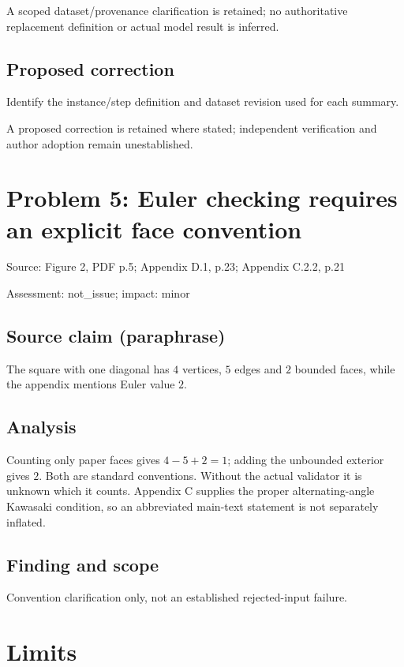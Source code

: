 \documentclass[11pt]{article}
\begin{document}
A scoped dataset/provenance clarification is retained; no authoritative replacement definition or actual model result is inferred.

\subsection*{Proposed correction}

Identify the instance/step definition and dataset revision used for each summary.

A proposed correction is retained where stated; independent verification and author adoption remain unestablished.

\section*{Problem 5: Euler checking requires an explicit face convention}

Source: Figure 2, PDF p.5; Appendix D.1, p.23; Appendix C.2.2, p.21

Assessment: not\_issue; impact: minor

\subsection*{Source claim (paraphrase)}

The square with one diagonal has \(4\) vertices, \(5\) edges and \(2\) bounded faces, while the appendix mentions Euler value \(2\).

\subsection*{Analysis}

Counting only paper faces gives \(4-5+2=1\); adding the unbounded exterior gives \(2\). Both are standard conventions. Without the actual validator it is unknown which it counts. Appendix C supplies the proper alternating-angle Kawasaki condition, so an abbreviated main-text statement is not separately inflated.

\subsection*{Finding and scope}

Convention clarification only, not an established rejected-input failure.

\section*{Limits}
\end{document}
